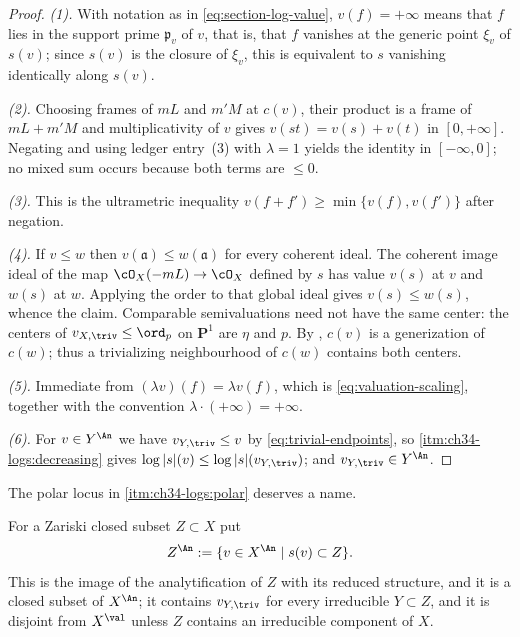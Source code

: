 \begin{proof}
\emph{(1).}  With notation as in
\eqref{eq:section-log-value}, $v(f)=+\infty$ means that $f$ lies in the
support prime $\mathfrak p_v$ of $v$, that is, that $f$ vanishes at
the generic point $\xi_v$ of $s(v)$; since $s(v)$ is the closure of
$\xi_v$, this is equivalent to $s$ vanishing identically along
$s(v)$.

\emph{(2).}  Choosing frames of $mL$ and
$m'M$ at $c(v)$, their product is a frame of $mL+m'M$ and
multiplicativity of $v$ gives $v(st)=v(s)+v(t)$ in $[0,+\infty]$.
Negating and using ledger entry~(3) with $\lambda=1$ yields the identity
in $[-\infty,0]$; no mixed sum occurs because both terms are
$\le0$.

\emph{(3).}  This is the ultrametric inequality
$v(f+f')\ge\min\{v(f),v(f')\}$ after negation.

\emph{(4).}  If $v\le w$ then
$v(\mathfrak a)\le w(\mathfrak a)$ for every coherent ideal.  The
coherent image ideal of the map $\cO_X(-mL)\to\cO_X$ defined by $s$
has value $v(s)$ at $v$ and $w(s)$ at $w$.  Applying the order to that
global ideal gives $v(s)\le w(s)$, whence the claim.
Comparable semivaluations need not have the same center: the centers of
$v_{X,\triv}\leq\ord_p$ on $\mathbf P^1$ are $\eta$ and $p$.
By , $c(v)$ is a generization of $c(w)$;
thus a trivializing neighbourhood of $c(w)$ contains both centers.

\emph{(5).}  Immediate from
$(\lambda v)(f)=\lambda v(f)$, which is
\eqref{eq:valuation-scaling}, together with the convention
$\lambda\cdot(+\infty)=+\infty$.

\emph{(6).}  For $v\in Y^{\An}$ we have
$v_{Y,\triv}\le v$ by \eqref{eq:trivial-endpoints}, so
\cref{itm:ch34-logs:decreasing} gives
$\log|s|(v)\le\log|s|(v_{Y,\triv})$; and $v_{Y,\triv}\in Y^{\An}$.
\end{proof}

The polar locus in \cref{itm:ch34-logs:polar} deserves a name.

\begin{definition}
\label{def:ch34-analytic-closed-subset}
For a Zariski closed subset $Z\subset X$ put
\begin{equation}
\label{eq:ch34-Z-an}
 Z^{\An}:=\{v\in X^{\An}\mid s(v)\subset Z\}.
\end{equation}
This is the image of the analytification of $Z$ with its reduced
structure, and it is a closed subset of $X^{\An}$; it contains
$v_{Y,\triv}$ for every irreducible $Y\subset Z$, and it is disjoint
from $X^{\val}$ unless $Z$ contains an irreducible component of $X$.
\end{definition}


